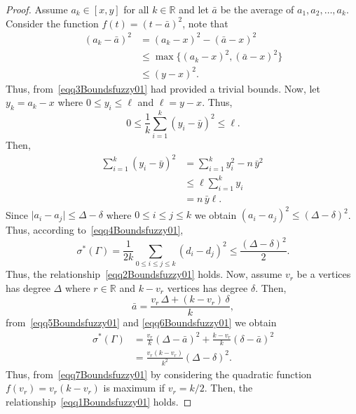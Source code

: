 \documentclass[10pt,a4paper]{amsart}
\newcommand{\SF}{\sigma^*}
\begin{document}
\begin{proof}
Assume $a_k\in [x,y]$ for all $k\in \mathbb{R}$ and let $\bar{a}$ be the average of $a_1,a_2,\dots,a_k$. Consider the function $f(t)=(t-\bar{a})^2$, note that 
\begin{equation}~\label{eqq3Boundsfuzzy01}
\begin{aligned}
(a_k-\bar{a})^2&=(a_k-x)^2-(\bar{a}-x)^2\\
&\leqslant \max\{(a_k-x)^2,(\bar{a}-x)^2 \}\\
&\leqslant (y-x)^2.
\end{aligned}
\end{equation}
Thus, from~\eqref{eqq3Boundsfuzzy01} had provided a trivial bounds. Now, let $y_k=a_k-x$ where $0\leq y_i\leq \ell$ and $\ell=y-x$. Thus, 
\begin{equation}~\label{eqq4Boundsfuzzy01}
0\leq \frac{1}{k}\sum_{i=1}^{k}(y_i-\bar{y})^2\leq \ell. 
\end{equation}
Then, 
\begin{align*}
\sum_{i=1}^{k}(y_i-\bar{y})^2 &=\sum_{i=1}^{k}y_i^2-n\,\bar{y}^2\\
&\leqslant \ell \sum_{i=1}^{k}y_i \\
&=n\,\bar{y}\ell.
\end{align*}
Since $\lvert a_i-a_j\rvert \leqslant \Delta-\delta$ where $0\leq i\leq j\leq k$ we obtain $(a_i-a_j)^2\leqslant (\Delta-\delta)^2$. Thus, according to~\eqref{eqq4Boundsfuzzy01}, 
\begin{equation}~\label{eqq5Boundsfuzzy01}
\SF(\Gamma)=\frac{1}{2k}\sum_{0\leq i\leq j\leq k}(d_i-d_j)^2 \leqslant \frac{(\Delta-\delta)^2}{2}.
\end{equation}
Thus, the relationship~\eqref{eqq2Boundsfuzzy01} holds. 
Now, assume $v_r$ be a vertices has degree $\Delta$ where $r\in \mathbb{R}$ and $k-v_r$ vertices has degree $\delta$. Then, 
\begin{equation}~\label{eqq6Boundsfuzzy01}
\bar{a}=\frac{v_r\,\Delta+(k-v_r)\,\delta}{k},
\end{equation}
from~\eqref{eqq5Boundsfuzzy01} and \eqref{eqq6Boundsfuzzy01} we obtain 
\begin{equation}~\label{eqq7Boundsfuzzy01}
\begin{aligned}
\SF(\Gamma)&=\frac{v_r}{k}\left(\Delta-\bar{a}\right)^2+\frac{k-v_r}{k}\left(\delta-\bar{a}\right)^2\\
&=\frac{v_r(k-v_r)}{k^2}(\Delta-\delta)^2.
\end{aligned}
\end{equation}
Thus, from~\eqref{eqq7Boundsfuzzy01} by considering the quadratic function $f(v_r)=v_r(k-v_r)$ is maximum if $v_r=k/2$. Then,  the relationship~\eqref{eqq1Boundsfuzzy01} holds.
\end{proof}
\end{document}
